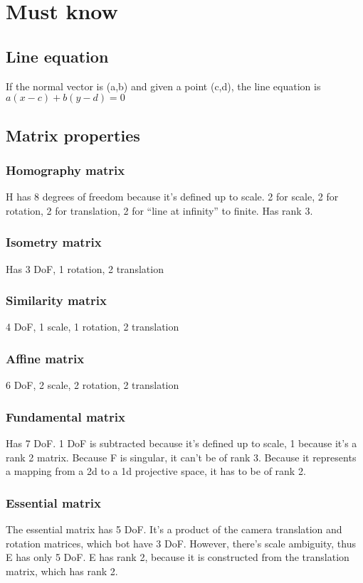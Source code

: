 \section{Must know}

\subsection{Line equation}

If the normal vector is (a,b) and given a point (c,d), the line equation is
\(a(x-c) + b(y-d)=0\)


\subsection{Matrix properties}

\subsubsection{Homography matrix}
H has 8 degrees of freedom because it's defined up to scale.
2 for scale, 2 for rotation, 2 for translation, 2 for ``line at infinity'' to
finite. Has rank 3.

\subsubsection{Isometry matrix}
Has 3 DoF, 1 rotation, 2 translation

\subsubsection{Similarity matrix}
4 DoF, 1 scale, 1 rotation, 2 translation

\subsubsection{Affine matrix}
6 DoF, 2 scale, 2 rotation, 2 translation

\subsubsection{Fundamental matrix}
Has 7 DoF. 1 DoF is subtracted because it's defined up to scale, 1 because it's
a rank 2 matrix. Because F is singular, it can't be of rank 3. Because it
represents a mapping from a 2d to a 1d projective space, it has to be of rank
2.

\subsubsection{Essential matrix}
The essential matrix has 5 DoF. It's a product of the camera translation and
rotation matrices, which bot have 3 DoF. However, there's scale ambiguity, thus
E has only 5 DoF. E has rank 2, because it is constructed from the translation
matrix, which has rank 2.

